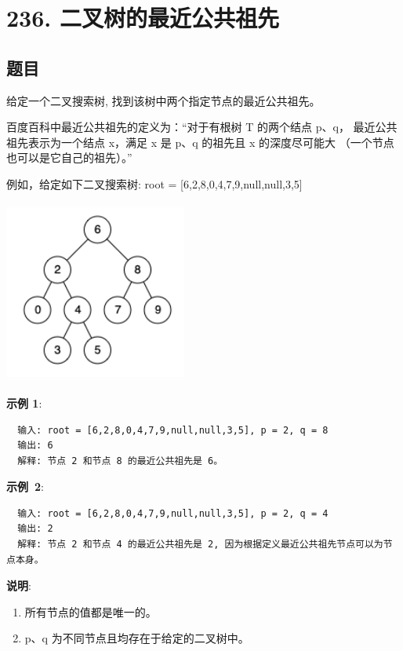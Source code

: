 \newpage
\section{236. 二叉树的最近公共祖先}
\label{leetcode:236}

\subsection{题目}

给定一个二叉搜索树, 找到该树中两个指定节点的最近公共祖先。

百度百科中最近公共祖先的定义为：``对于有根树 T 的两个结点 p、q，
最近公共祖先表示为一个结点 x，满足 x 是 p、q 的祖先且 x 的深度尽可能大
（一个节点也可以是它自己的祖先）。''

例如，给定如下二叉搜索树:  root = [6,2,8,0,4,7,9,null,null,3,5]

\includegraphics[width=60mm,height=60mm]{images/leetcode/binarysearchtree_improved.png}

\textbf{示例 1}:

\begin{verbatim}
  输入: root = [6,2,8,0,4,7,9,null,null,3,5], p = 2, q = 8
  输出: 6
  解释: 节点 2 和节点 8 的最近公共祖先是 6。
\end{verbatim}

\textbf{示例 2}:

\begin{verbatim}
  输入: root = [6,2,8,0,4,7,9,null,null,3,5], p = 2, q = 4
  输出: 2
  解释: 节点 2 和节点 4 的最近公共祖先是 2, 因为根据定义最近公共祖先节点可以为节点本身。
\end{verbatim}

\textbf{说明}:

\begin{enumerate}
  \item 所有节点的值都是唯一的。
  \item p、q 为不同节点且均存在于给定的二叉树中。
\end{enumerate}

